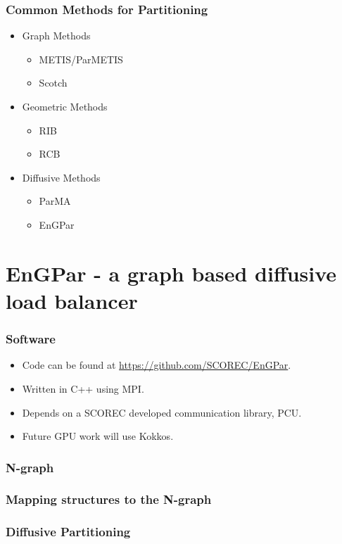 \documentclass{beamer}
\begin{document}
\begin{frame}
  \frametitle{Common Methods for Partitioning}
  \begin{itemize}
  \item Graph Methods %
    \begin{itemize}
    \item METIS/ParMETIS
    \item Scotch
    \end{itemize}
  \item Geometric Methods %
    \begin{itemize}
    \item RIB
    \item RCB
    \end{itemize}
  \item Diffusive Methods %
    \begin{itemize}
    \item ParMA
    \item EnGPar
    \end{itemize}
  \end{itemize}
\end{frame}

\section{EnGPar - a graph based diffusive load balancer}
\begin{frame}
  \frametitle{Software}
  \begin{itemize}
  \item Code can be found at \url{https://github.com/SCOREC/EnGPar}.
  \item Written in C++ using MPI.
  \item Depends on a SCOREC developed communication library, PCU.
  \item Future GPU work will use Kokkos.
  \end{itemize}
\end{frame}

\begin{frame}
  \frametitle{N-graph}
  
\end{frame}

\begin{frame}
  \frametitle{Mapping structures to the N-graph}
\end{frame}

\begin{frame}
  \frametitle{Diffusive Partitioning}
\end{frame}
\end{document}
